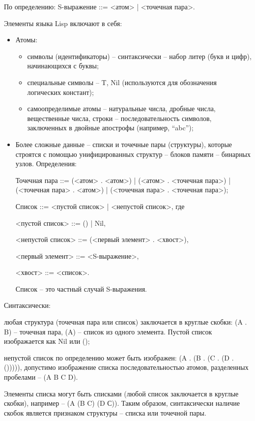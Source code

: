 \documentclass[12pt]{report}
\begin{document}
По определению: S-выражение ::= <атом> | <точечная пара>.
	
Элементы языка Lisp включают в себя:
\begin{itemize}
		\item Атомы:
		\begin{itemize} 
		\item символы (идентификаторы) – синтаксически – набор литер (букв и цифр), начинающихся с буквы;
		\item специальные символы – {T, Nil} (используются для обозначения логических констант);
		\item самоопределимые атомы – натуральные числа, дробные числа, вещественные числа, строки – последовательность символов, заключенных в двойные апострофы (например, “abc”);
		\end{itemize} 
		
		\item Более сложные данные – списки и точечные пары (структуры), которые строятся с помощью унифицированных структур – блоков памяти – бинарных узлов.
		Определения:
		
		Точечная пара ::= (<атом> . <атом>) | (<атом> . <точечная пара>) | (<точечная пара> . <атом>) | (<точечная пара> . <точечная пара>);
		
		Список ::= <пустой список> | <непустой список>, где 
		
		<пустой список> ::= () | Nil,
		
		<непустой список> ::= (<первый элемент> . <хвост>),
		
		<первый элемент> ::= <S-выражение>,
		
		<хвост> ::= <список>.
		
		Список – это частный случай S-выражения.
		
\end{itemize}

Синтаксически:

любая структура (точечная пара или список) заключается в круглые скобки: (A . B) – точечная пара, (A) – список из одного элемента. Пустой список изображается как Nil или ();

непустой список по определению может быть изображен: (A . (B . (C . (D . ())))),  допустимо изображение списка последовательностью атомов, разделенных пробелами – (A B C D).

Элементы списка могут быть списками (любой список заключается в круглые скобки), например – (A (B C) (D С)). Таким образом, синтаксически наличие скобок является признаком структуры – списка или точечной пары.
\end{document}
